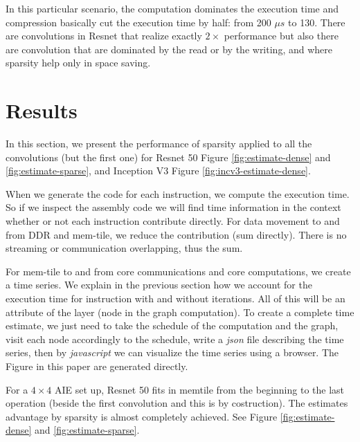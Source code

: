 \documentclass[conference]{IEEEtran}
\begin{document}
In this particular scenario, the computation dominates the execution
time and compression basically cut the execution time by half: from
200 $\mu s$ to 130. There are convolutions in Resnet that realize
exactly $2\times$ performance but also there are convolution that are
dominated by the read or by the writing, and where sparsity help only
in space saving.


\section{Results}
\label{sec:experiments}
In this section, we present the performance of sparsity applied to all
the convolutions (but the first one) for Resnet 50 Figure
\ref{fig:estimate-dense} and \ref{fig:estimate-sparse}, and Inception
V3 Figure \ref{fig:incv3-estimate-dense}.


When we generate the code for each instruction, we compute the
execution time. So if we inspect the assembly code we will find time
information in the context whether or not each instruction contribute
directly. For data movement to and from DDR and mem-tile, we reduce
the contribution (sum directly). There is no streaming or
communication overlapping, thus the sum.

For mem-tile to and from core communications and core computations, we
create a time series. We explain in the previous section how we
account for the execution time for instruction with and without
iterations. All of this will be an attribute of the layer (node in the
graph computation).  To create a complete time estimate, we just need
to take the schedule of the computation and the graph, visit each node
accordingly to the schedule, write a {\em json} file describing the
time series, then by {\em javascript} we can visualize the time series
using a browser. The Figure in this paper are generated directly.

For a $4\times 4$ AIE set up, Resnet 50 fits in memtile from the
beginning to the last operation (beside the first convolution and this
is by costruction). The estimates advantage by sparsity is almost
completely achieved.  See Figure \ref{fig:estimate-dense} and
\ref{fig:estimate-sparse}.
\end{document}
